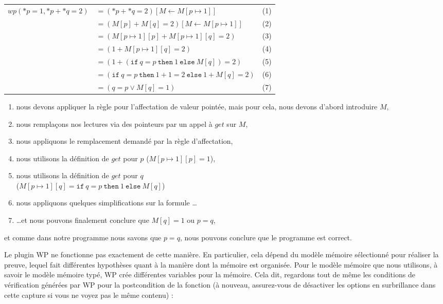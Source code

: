 \begin{tabular}{lll}
  $wp(*p = 1, *p + *q = 2)$
  & $= (*p + *q = 2)[M \leftarrow M[p \mapsto 1]]$ & (1)\\
  & $= (M[p] + M[q] = 2)[M \leftarrow M[p \mapsto 1]]$ & (2)\\
  & $= (M[p \mapsto 1][p] + M[p \mapsto 1][q] = 2)$ & (3)\\
  & $= (1 + M[p \mapsto 1][q] = 2)$ & (4)\\
  & $= (1 + (\texttt{if}\ q = p\ \texttt{then}\ 1\ \texttt{else}\ M[q]) = 2)$ & (5)\\
  & $= (\texttt{if}\ q = p\ \texttt{then}\ 1+1 = 2\ \texttt{else}\ 1+M[q] = 2)$ & (6)\\
  & $= (q = p \vee M[q] = 1)$ & (7)
\end{tabular}
\begin{enumerate}
\item nous devons appliquer la règle pour l'affectation de valeur pointée, mais
  pour cela, nous devons d'abord introduire $M$,
\item nous remplaçons nos lectures via des pointeurs par un appel à $get$ sur $M$,
\item nous appliquons le remplacement demandé par la règle d'affectation,
\item nous utilisons la définition de $get$ pour $p$ ($M[p \mapsto 1][p] = 1$),
\item nous utilisons la définition de $get$ pour $q$\\
  ($M[p \mapsto 1][q] = \texttt{if}\ q = p\ \texttt{then}\ 1\ \texttt{else}\ M[q]$)
\item nous appliquons quelques simplifications sur la formule \dots
\item \dots et nous pouvons finalement conclure que $M[q] = 1$ ou $p = q$,
\end{enumerate}
et comme dans notre programme nous savons que $p = q$, nous pouvons conclure que
le programme est correct.


Le plugin WP ne fonctionne pas exactement de cette manière. En particulier, cela dépend du
modèle mémoire sélectionné pour réaliser la preuve, lequel fait différentes hypothèses
quant à la manière dont la mémoire est organisée. Pour le modèle mémoire que nous
utilisons, à savoir le modèle mémoire typé, WP crée différentes variables pour la mémoire.
Cela dit, regardons tout de même les conditions de vérification générées par WP pour la
postcondition de la fonction  (à nouveau, assurez-vous de
désactiver les options en surbrillance dans cette capture si vous ne voyez pas
le même contenu) :


